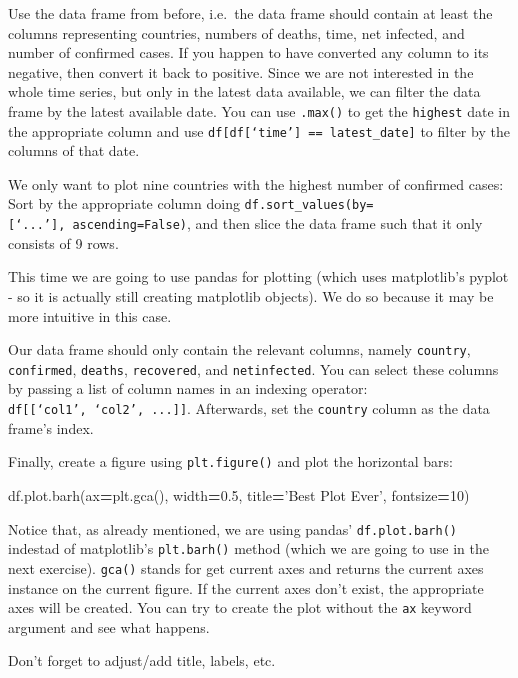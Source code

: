 \documentclass[
  11pt,
]{article}
\newenvironment{Shaded}{\begin{snugshade}}{\end{snugshade}}
\newcommand{\DecValTok}[1]{\textcolor[rgb]{0.00,0.00,0.81}{#1}}
\newcommand{\FloatTok}[1]{\textcolor[rgb]{0.00,0.00,0.81}{#1}}
\newcommand{\NormalTok}[1]{#1}
\newcommand{\OperatorTok}[1]{\textcolor[rgb]{0.81,0.36,0.00}{\textbf{#1}}}
\newenvironment{tipsp}[1]
  {
  \begin{itemize}
  \footnotesize
  \renewcommand{\labelitemi}{
    \raisebox{-.7\height}[0pt][0pt]{
      {\setkeys{Gin}{width=3em,keepaspectratio}
        \texttt{[image: images/\#1.png]}}
    }
  }
  \setlength{\fboxsep}{1em}
  \begin{pbox}
  \item
  }
  {
  \end{pbox}
  \end{itemize}
  }
\begin{document}
\begin{tipsp}p

Use the data frame from before, i.e.~the data frame should contain at least the columns representing countries, numbers of deaths, time, net infected, and number of confirmed cases.
If you happen to have converted any column to its negative, then convert it back to positive.
Since we are not interested in the whole time series, but only in the latest data available, we can filter the data frame by the latest available date. You can use \texttt{.max()} to get the \texttt{highest} date in the appropriate column and use \texttt{df{[}df{[}‘time’{]}\ ==\ latest\_date{]}} to filter by the columns of that date.

We only want to plot nine countries with the highest number of confirmed cases: Sort by the appropriate column doing \texttt{df.sort\_values(by={[}‘...’{]},\ ascending=False)}, and then slice the data frame such that it only consists of 9 rows.

This time we are going to use pandas for plotting (which uses matplotlib's pyplot - so it is actually still creating matplotlib objects). We do so because it may be more intuitive in this case.

Our data frame should only contain the relevant columns, namely \texttt{country}, \texttt{confirmed}, \texttt{deaths}, \texttt{recovered}, and \texttt{netinfected}. You can select these columns by passing a list of column names in an indexing operator: \texttt{df{[}{[}‘col1’,\ ‘col2’,\ ...{]}{]}}. Afterwards, set the \texttt{country} column as the data frame's index.

Finally, create a figure using \texttt{plt.figure()} and plot the horizontal bars:

\begin{Shaded}
\begin{Highlighting}[]
\NormalTok{df.plot.barh(ax}\OperatorTok{=}\NormalTok{plt.gca(), width}\OperatorTok{=}\FloatTok{0.5}\NormalTok{, title}\OperatorTok{=}\NormalTok{’Best Plot Ever’, fontsize}\OperatorTok{=}\DecValTok{10}\NormalTok{)}
\end{Highlighting}
\end{Shaded}

Notice that, as already mentioned, we are using pandas' \texttt{df.plot.barh()} indestad of matplotlib's \texttt{plt.barh()} method (which we are going to use in the next exercise).
\texttt{gca()} stands for get current axes and returns the current axes instance on the current figure. If the current axes don't exist, the appropriate axes will be created. You can try to create the plot without the \texttt{ax} keyword argument and see what happens.

Don't forget to adjust/add title, labels, etc.

\end{tipsp}
\end{document}
